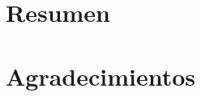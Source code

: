 \documentclass[12pt, oneside]{book}
\begin{document}
\chapter{Resumen}

% 

\chapter{Agradecimientos}


\tableofcontents

\listoffigures

\mainmatter




% 



% 
\end{document}
